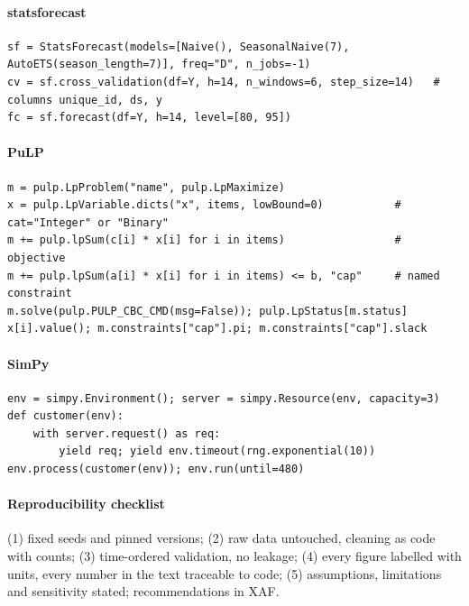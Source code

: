 \paragraph{statsforecast}
\begin{lstlisting}[style=py,numbers=none,xleftmargin=4pt,framexleftmargin=4pt]
sf = StatsForecast(models=[Naive(), SeasonalNaive(7), AutoETS(season_length=7)], freq="D", n_jobs=-1)
cv = sf.cross_validation(df=Y, h=14, n_windows=6, step_size=14)   # columns unique_id, ds, y
fc = sf.forecast(df=Y, h=14, level=[80, 95])
\end{lstlisting}

\paragraph{PuLP}
\begin{lstlisting}[style=py,numbers=none,xleftmargin=4pt,framexleftmargin=4pt]
m = pulp.LpProblem("name", pulp.LpMaximize)
x = pulp.LpVariable.dicts("x", items, lowBound=0)           # cat="Integer" or "Binary"
m += pulp.lpSum(c[i] * x[i] for i in items)                 # objective
m += pulp.lpSum(a[i] * x[i] for i in items) <= b, "cap"     # named constraint
m.solve(pulp.PULP_CBC_CMD(msg=False)); pulp.LpStatus[m.status]
x[i].value(); m.constraints["cap"].pi; m.constraints["cap"].slack
\end{lstlisting}

\paragraph{SimPy}
\begin{lstlisting}[style=py,numbers=none,xleftmargin=4pt,framexleftmargin=4pt]
env = simpy.Environment(); server = simpy.Resource(env, capacity=3)
def customer(env):
    with server.request() as req:
        yield req; yield env.timeout(rng.exponential(10))
env.process(customer(env)); env.run(until=480)
\end{lstlisting}

\paragraph{Reproducibility checklist}
(1) fixed seeds and pinned versions; (2) raw data untouched, cleaning as code with counts; (3) time-ordered validation,
no leakage; (4) every figure labelled with units, every number in the text traceable to code; (5) assumptions,
limitations and sensitivity stated; recommendations in XAF.


